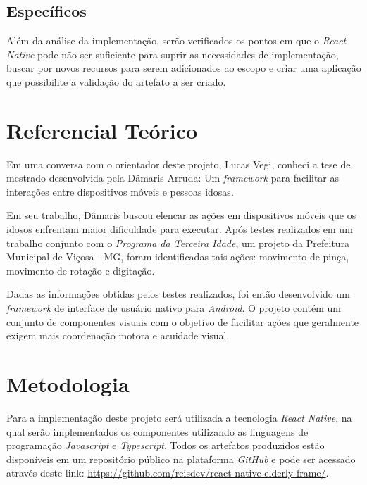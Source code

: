 \documentclass[
	12pt,				    %
	openright,			    %
	oneside,			    %
	a4paper,			    %
    sumario=tradicional,    %
	english,			    %
	brazil,				    %
	]{abntex2}              %
\begin{document}
\section{Específicos}

Além da análise da implementação, serão verificados os pontos em que o \emph{React Native} pode não ser suficiente para suprir as necessidades de implementação, buscar por novos recursos para serem adicionados ao escopo e criar uma aplicação que possibilite a validação do artefato a ser criado.


\chapter{Referencial Teórico}\label{sec:referencialTeorico}

Em uma conversa com o orientador deste projeto, Lucas Vegi, conheci a tese de mestrado desenvolvida pela Dâmaris Arruda: Um \textit{framework} para facilitar as interações entre dispositivos móveis e pessoas idosas\cite{tesedamaris}.

\par

Em seu trabalho, Dâmaris buscou elencar as ações em dispositivos móveis que os idosos enfrentam maior dificuldade para executar. Após testes realizados em um trabalho conjunto com o \emph{Programa da Terceira Idade}, um projeto da Prefeitura Municipal de Viçosa - MG, foram identificadas tais ações: movimento de pinça, movimento de rotação e digitação.

\par

Dadas as informações obtidas pelos testes realizados, foi então desenvolvido um \textit{framework} de interface de usuário nativo para \textit{Android}. O projeto contém um conjunto de componentes visuais com o objetivo de facilitar ações que geralmente exigem mais coordenação motora e acuidade visual.

\chapter{Metodologia}\label{sec:metodologia}

Para a implementação deste projeto será utilizada a tecnologia \emph{React Native}, na qual serão implementados os componentes utilizando as linguagens de programação \emph{Javascript} e \emph{Typescript}. Todos os artefatos produzidos estão disponíveis em um repositório público na plataforma \emph{GitHub} e pode ser acessado através deste link: \href{https://github.com/reisdev/react-native-elderly-frame/}{https://github.com/reisdev/react-native-elderly-frame/}.
\end{document}
